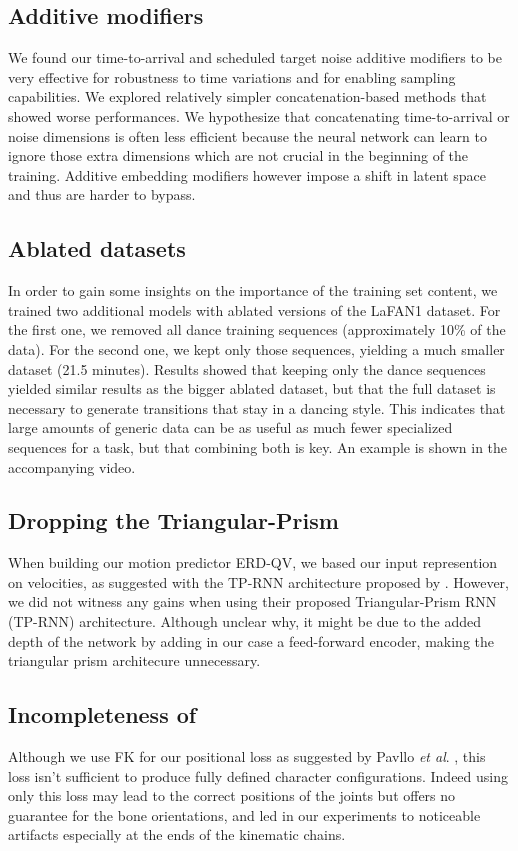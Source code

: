 \documentclass[acmtog]{acmart}
\newcommand{\etal}{\textit{et al}. }
\begin{document}
\subsection{Additive modifiers}
We found our time-to-arrival and scheduled target noise additive modifiers to be very effective for robustness to time variations and for enabling sampling capabilities. We explored relatively simpler concatenation-based methods that showed worse performances. We hypothesize that concatenating time-to-arrival or noise dimensions is often less efficient because the neural network can learn to ignore those extra dimensions which are not crucial in the beginning of the training. Additive embedding modifiers however impose a shift in latent space and thus are harder to bypass.  
\subsection{Ablated datasets}
In order to gain some insights on the importance of the training set content, we trained two additional models with ablated versions of the LaFAN1 dataset. For the first one, we removed all dance training sequences (approximately 10\% of the data). For the second one, we kept only those sequences, yielding a much smaller dataset (21.5 minutes). Results showed that keeping only the dance sequences yielded similar results as the bigger ablated dataset, but that the full dataset is necessary to generate transitions that stay in a dancing style. This indicates that large amounts of generic data can be as useful as much fewer specialized sequences for a task, but that combining both is key. An example is shown in the accompanying video.

\subsection{Dropping the Triangular-Prism}
When building our motion predictor ERD-QV, we based our input represention on velocities, as suggested with the TP-RNN architecture proposed by \cite{chiu2019action}. However, we did not witness any gains when using their proposed Triangular-Prism RNN (TP-RNN) architecture. Although unclear why, it might be due to the added depth of the network by adding in our case a feed-forward encoder, making the triangular prism architecure unnecessary.

\subsection{Incompleteness of }
Although we use FK for our positional loss  as suggested by Pavllo \etal {}, this loss isn't sufficient to produce fully defined character configurations. Indeed using only this loss may lead to the correct positions of the joints but offers no guarantee for the bone orientations, and led in our experiments to noticeable artifacts especially at the ends of the kinematic chains.
\end{document}
